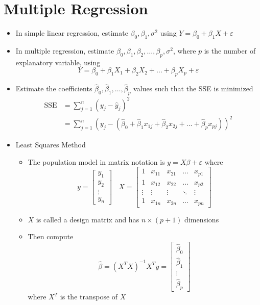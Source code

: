 \documentclass[12pt]{article}
\begin{document}
\section{Multiple Regression}
\begin{itemize}
\item In simple linear regression, estimate $\beta_0,\beta_1,\sigma^2$ using $Y = \beta_0 + \beta_1X + \varepsilon$
\item In multiple regression, estimate $\beta_0,\beta_1,\beta_2,\dots,\beta_p,\sigma^2$, where $p$ is the number of explanatory variable, using $$Y = \beta_0 + \beta_1X_1 + \beta_2X_2 + \dots + \beta_pX_p + \varepsilon $$ 
\item Estimate the coefficients $\hat{\beta}_0,\hat{\beta}_1,\dots,\hat{\beta}_p$ values such that the SSE is minimized $$ \begin{aligned} \text{SSE} &= \sum_{j=1}^n (y_j - \hat{y}_j)^2 \\ &= \sum_{j=1}^n (y_j - (\hat{\beta}_0 + \hat{\beta}_1x_{1j} + \hat{\beta}_2x_{2j} + \dots + \hat{\beta}_px_{pj}))^2 \end{aligned} $$ 
\item Least Squares Method \begin{itemize} 
\item The population model in matrix notation is $y = X\beta + \varepsilon$ where 
$$ y = \begin{bmatrix} y_1 \\ y_2 \\ \vdots \\ y_n \end{bmatrix} ~~~~ X = \begin{bmatrix} 1 & x_{11} & x_{21} & \dots & x_{p1} \\ 1 & x_{12} & x_{22} & \dots & x_{p2} \\ \vdots & \vdots & \vdots & \ddots & \vdots \\ 1 & x_{1n} & x_{2n} & \dots & x_{pn} \end{bmatrix} $$ 
\item $X$ is called a design matrix and has $n \times (p+1)$ dimensions
\item Then compute $$ \hat{\beta} = (X^TX)^{-1}X^Ty = \begin{bmatrix} \hat{\beta}_0 \\ \hat{\beta}_1 \\ \vdots \\ \hat{\beta}_p \end{bmatrix} $$ where $X^T$ is the transpose of $X$ \end{itemize} 

\end{itemize}
\end{document}
